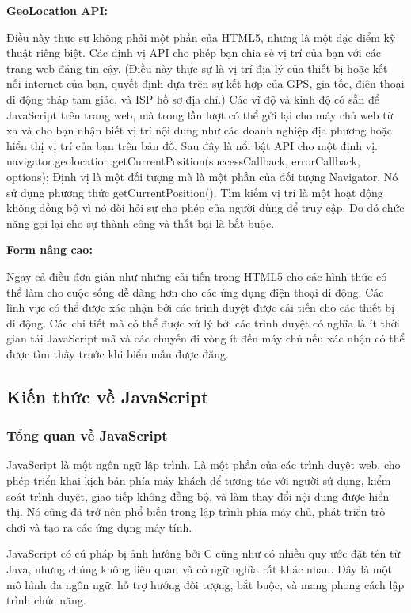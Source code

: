 \textbf{GeoLocation API:}

Điều này thực sự không phải một phần của HTML5, nhưng là một đặc điểm kỹ thuật riêng biệt. Các định vị API cho phép bạn chia sẻ vị trí của bạn với các trang web đáng tin cậy. (Điều này thực sự là vị trí địa lý của thiết bị hoặc kết nối internet của bạn, quyết định dựa trên sự kết hợp của GPS, gia tốc, điện thoại di động tháp tam giác, và ISP hồ sơ địa chỉ.) Các vĩ độ và kinh độ có sẵn để JavaScript trên trang web, mà trong lần lượt có thể gửi lại cho máy chủ web từ xa và cho bạn nhận biết vị trí nội dung như các doanh nghiệp địa phương hoặc hiển thị vị trí của bạn trên bản đồ.
Sau đây là nổi bật API cho một định vị.
 navigator.geolocation.getCurrentPosition(successCallback, errorCallback, options);
Định vị là một đối tượng mà là một phần của đối tượng Navigator. Nó sử dụng phương thức getCurrentPosition(). Tìm kiếm vị trí là một hoạt động không đồng bộ vì nó đòi hỏi sự cho phép của người dùng để truy cập. Do đó chức năng gọi lại cho sự thành công và thất bại là bắt buộc.

\textbf{Form nâng cao:}

Ngay cả điều đơn giản như những cải tiến trong HTML5 cho các hình thức có thể làm cho cuộc sống dễ dàng hơn cho các ứng dụng điện thoại di động. Các lĩnh vực có thể được xác nhận bởi các trình duyệt được cải tiến cho các thiết bị di động. Các chi tiết mà có thể được xử lý bởi các trình duyệt có nghĩa là ít thời gian tải JavaScript mã và các chuyến đi vòng ít đến máy chủ nếu xác nhận có thể được tìm thấy trước khi biểu mẫu được đăng.

\subsection{Kiến thức về JavaScript}
\subsubsection{Tổng quan về JavaScript}
JavaScript là một ngôn ngữ lập trình. Là một phần của các trình duyệt web, cho phép triển khai kịch bản phía máy khách để tương tác với người sử dụng, kiểm soát trình duyệt, giao tiếp không đồng bộ, và làm thay đổi nội dung được hiển thị. Nó cũng đã trở nên phổ biến trong lập trình phía máy chủ, phát triển trò chơi và tạo ra các ứng dụng máy tính.

JavaScript có cú pháp bị ảnh hưởng bởi C cũng như có nhiều quy ước đặt tên từ Java, nhưng chúng không liên quan và có ngữ nghĩa rất khác nhau. Đây là một mô hình đa ngôn ngữ, hỗ trợ hướng đối tượng, bắt buộc, và mang phong cách lập trình chức năng.
 

